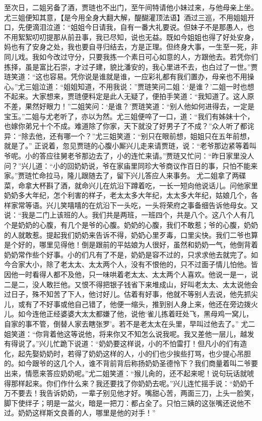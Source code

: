 \documentclass[12pt,oneside]{book}
\begin{document}
至次日，二姐另备了酒，贾琏也不出门，至午间特请他小妹过来，与他母亲上坐。尤三姐便知其意，【是今用全身大翻大解，醍醐灌顶法语】酒过三巡，不用姐姐开口，先便滴泪泣道：“姐姐今日请我，自有一番大礼要说。但妹子不是那愚人，也不用絮絮叨叨提那从前丑事，我已尽知，说也无益。既如今姐姐也得了好处安身，妈也有了安身之处，我也要自寻归结去，方是正理。但终身大事，一生至一死，非同儿戏。我如今改过守分，只要我拣一个素日可心如意的人，方跟他去。若凭你们拣择，虽是富比石崇，才过子建，貌比潘安的，我心里进不去，也白过了一世。”贾琏笑道：“这也容易。凭你说是谁就是谁，一应彩礼都有我们置办，母亲也不用操心。”尤三姐泣道：“姐姐知道，不用我说：”贾琏笑问二姐：‘是谁？’二姐一时也想不起来。大家想来，贾琏便料定是此人无疑了，便拍手笑道：“我知道了。这人原不差，果然好眼力！”二姐笑问：‘是谁？’贾琏笑道：“别人他如何进得去，一定是宝玉。”二姐与尤老听了，亦以为然。尤三姐便啐了一口，道：“我们有姊妹十个，也嫁你弟兄十个不成。难道除了你家，天下就没了好男子了不成？”众人听了都诧异：“除去他，还有哪一个？”尤三姐笑道：“别只在眼前想，姐姐只在五年前想，就是了。”
正说着，忽见贾琏的心腹小厮兴儿走来请贾琏，说：“老爷那边紧等着叫爷呢。小的答应往舅老爷那边去了，小的连忙来请。”贾琏又忙问：“昨日家里没人问？”兴儿道：“小的回奶奶说，爷在家庙里同珍大爷商议作百日的事，只怕不能来家。”贾琏忙命拉马，隆儿跟随去了，留下兴儿答应人来事务。
尤二姐拿了两碟菜，命拿大杯斟了酒，就命兴儿在炕沿下蹲着吃，一长一短向他说话儿。问他家里奶奶多大年纪，怎个利害的样子，老太太多大年纪，太太多大年纪，姑娘几个，各样家常等语。兴儿笑嘻嘻的在炕沿下一头吃，一头将荣府之事备细告诉他母女。又说：“我是二门上该班的人。我们共是两班，一班四个，共是八个。这八个人有几个是奶奶的心腹，有几个是爷的心腹。奶奶的心腹，我们不敢惹；爷的心腹，奶奶的人就敢惹。提起我们奶奶来告诉不得，奶奶心里歹毒，口里尖快。我们二爷也算是个好的，哪里见得他！倒是跟前的平姑娘为人很好，虽然和奶奶一气，他倒背着奶奶常作些个好事。小的们凡有了不是，奶奶是容不过的，只求求他去就完了。如今合家大小，除了老太太、太太两个人，没有不恨他的，只不过面子情儿怕他。皆因他一时看得人都不及他，只一味哄着老太太、太太两个人喜欢。他说一是一，说二是二，没人敢拦他。又恨不得把银子钱省下来堆成山，好叫老太太、太太说他会过日子，殊不知苦了下人，他讨好儿。估着有好事，他就不等别人去说，他先抓尖儿，或有了不好事或他自己错了，他便一缩头，推到别人身上来，他还在旁边拨火儿。如今连他正经婆婆大太太都嫌了他，说他‘雀儿拣着旺处飞，黑母鸡一窝儿，自家的事不管，倒替人家去瞎张罗’。若不是老太太在头里，早叫过他去了。”
尤二姐笑道：“你背着他这等说他，将来你又不知怎么说我呢。我又差他一层儿，越发有得说了。”兴儿忙跪下说道：“奶奶要这样说，小的不怕雷打！但凡小的们有造化，起先娶奶奶时，若得了奶奶这样的人，小的们也少挨些打骂，也少提心吊胆的。如今跟爷的这几个人，谁不背前背后称扬奶奶圣德怜下？我们商量着叫二爷要出来，情愿来答应奶奶呢。”尤二姐笑道：“猴儿肏的，还不起来呢！说句玩话就唬得那样起来。你们作什么来？我还要找了你奶奶去呢。”兴儿连忙摇手说：“奶奶千万不要去！我告诉奶奶，一辈子别见他才好。嘴甜心苦，两面三刀，上头一脸笑，脚下使绊子；明是一盆火，暗是一把刀：都占全了。只怕三姨的这张嘴还说他不过。奶奶这样斯文良善的人，哪里是他的对手！”
\end{document}
